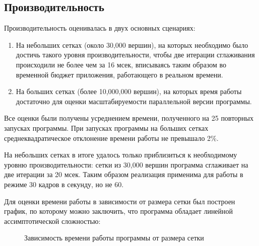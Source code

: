 \documentclass[14pt]{extarticle}
\begin{document}
\subsection{Производительность}
Производительность оценивалась в двух основных сценариях: 
\begin{enumerate}
    \item На небольших сетках (около 30,000 вершин), на которых необходимо было достичь такого уровня производительности, чтобы две итерации сглаживания происходили не более чем за 16 мсек, вписываясь таким образом во временной бюджет приложения, работающего в реальном времени.
    \item На больших сетках (более 10,000,000 вершин), на которых время работы достаточно для оценки масштабируемости параллельной версии программы.
\end{enumerate}

Все оценки были получены усреднением времени, полученного на 25 повторных запусках программы. При запусках программы на больших сетках среднеквадратическое отклонение времени работы не превышало 2\%.

На небольших сетках в итоге удалось только приблизиться к необходимому уровню производительности: сетки из 30,000 вершин программа сглаживает на две итерации за 20 мсек. Таким образом реализация применима для работы в режиме 30 кадров в секунду, но не 60.


Для оценки времени работы в зависимости от размера сетки был построен график, по которому можно заключить, что программа обладает линейной ассимптотической сложностью:

\begin{figure}[H]
    \centering
    
    \caption{Зависимость времени работы программы от размера сетки}
\end{figure}
\end{document}
